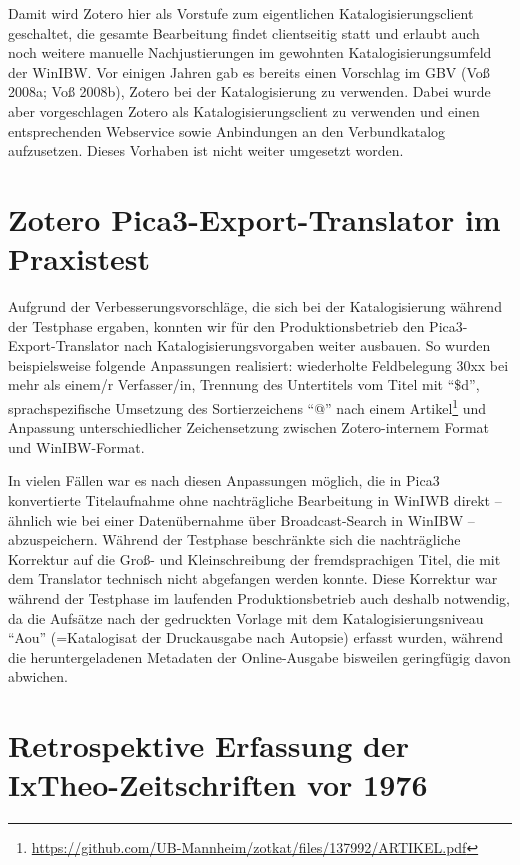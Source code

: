 \documentclass[a4paper,
fontsize=11pt,
oneside,
numbers=noperiodatend,
parskip=half-,
bibliography=totoc,
final
]{scrartcl}
\begin{document}
Damit wird Zotero hier als Vorstufe zum eigentlichen
Katalogisierungsclient geschaltet, die gesamte Bearbeitung findet
clientseitig statt und erlaubt auch noch weitere manuelle
Nachjustierungen im gewohnten Katalogisierungsumfeld der WinIBW. Vor
einigen Jahren gab es bereits einen Vorschlag im GBV (Voß 2008a; Voß
2008b), Zotero bei der Katalogisierung zu verwenden. Dabei wurde aber
vorgeschlagen Zotero als Katalogisierungsclient zu verwenden und einen
entsprechenden Webservice sowie Anbindungen an den Verbundkatalog
aufzusetzen. Dieses Vorhaben ist nicht weiter umgesetzt worden.

\section*{Zotero Pica3-Export-Translator im
Praxistest}\label{zotero-pica3-export-translator-im-praxistest}

Aufgrund der Verbesserungsvorschläge, die sich bei der Katalogisierung
während der Testphase ergaben, konnten wir für den Produktionsbetrieb
den Pica3-Export-Translator nach Katalogisierungsvorgaben weiter
ausbauen. So wurden beispielsweise folgende Anpassungen realisiert:
wiederholte Feldbelegung 30xx bei mehr als einem/r Verfasser/in,
Trennung des Untertitels vom Titel mit \enquote{\$d}, sprachspezifische
Umsetzung des Sortierzeichens \enquote{@} nach einem Artikel\footnote{\url{https://github.com/UB-Mannheim/zotkat/files/137992/ARTIKEL.pdf}}
und Anpassung unterschiedlicher Zeichensetzung zwischen Zotero-internem
Format und WinIBW-Format.

In vielen Fällen war es nach diesen Anpassungen möglich, die in Pica3
konvertierte Titelaufnahme ohne nachträgliche Bearbeitung in WinIWB
direkt -- ähnlich wie bei einer Datenübernahme über Broadcast-Search in
WinIBW -- abzuspeichern. Während der Testphase beschränkte sich die
nachträgliche Korrektur auf die Groß- und Kleinschreibung der
fremdsprachigen Titel, die mit dem Translator technisch nicht abgefangen
werden konnte. Diese Korrektur war während der Testphase im laufenden
Produktionsbetrieb auch deshalb notwendig, da die Aufsätze nach der
gedruckten Vorlage mit dem Katalogisierungsniveau \enquote{Aou}
(=Katalogisat der Druckausgabe nach Autopsie) erfasst wurden, während
die heruntergeladenen Metadaten der Online-Ausgabe bisweilen geringfügig
davon abwichen.

\section*{Retrospektive Erfassung der IxTheo-Zeitschriften vor
1976}\label{retrospektive-erfassung-der-ixtheo-zeitschriften-vor-1976}
\end{document}
